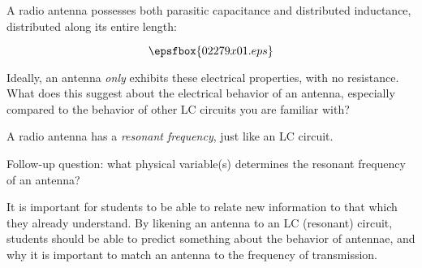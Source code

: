 

A radio antenna possesses both parasitic capacitance and distributed inductance, distributed along its entire length:

$$\epsfbox{02279x01.eps}$$

Ideally, an antenna {\it only} exhibits these electrical properties, with no resistance.  What does this suggest about the electrical behavior of an antenna, especially compared to the behavior of other LC circuits you are familiar with?







A radio antenna has a {\it resonant frequency}, just like an LC circuit.

\vskip 10pt

Follow-up question: what physical variable(s) determines the resonant frequency of an antenna?







It is important for students to be able to relate new information to that which they already understand.  By likening an antenna to an LC (resonant) circuit, students should be able to predict something about the behavior of antennae, and why it is important to match an antenna to the frequency of transmission.




